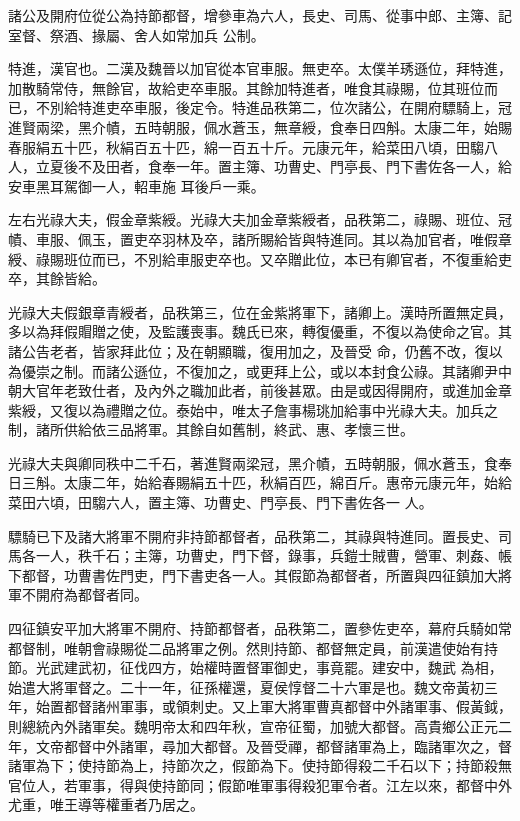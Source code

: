 \begin{pinyinscope}
 諸公及開府位從公為持節都督，增參車為六人，長史、司馬、從事中郎、主簿、記室督、祭酒、掾屬、舍人如常加兵
 公制。



 特進，漢官也。二漢及魏晉以加官從本官車服。無吏卒。太僕羊琇遜位，拜特進，加散騎常侍，無餘官，故給吏卒車服。其餘加特進者，唯食其祿賜，位其班位而已，不別給特進吏卒車服，後定令。特進品秩第二，位次諸公，在開府驃騎上，冠進賢兩梁，黑介幘，五時朝服，佩水蒼玉，無章綬，食奉日四斛。太康二年，始賜春服絹五十匹，秋絹百五十匹，綿一百五十斤。元康元年，給菜田八頃，田騶八人，立夏後不及田者，食奉一年。置主簿、功曹史、門亭長、門下書佐各一人，給安車黑耳駕御一人，軺車施
 耳後戶一乘。



 左右光祿大夫，假金章紫綬。光祿大夫加金章紫綬者，品秩第二，祿賜、班位、冠幘、車服、佩玉，置吏卒羽林及卒，諸所賜給皆與特進同。其以為加官者，唯假章綬、祿賜班位而已，不別給車服吏卒也。又卒贈此位，本已有卿官者，不復重給吏卒，其餘皆給。



 光祿大夫假銀章青綬者，品秩第三，位在金紫將軍下，諸卿上。漢時所置無定員，多以為拜假賵贈之使，及監護喪事。魏氏已來，轉復優重，不復以為使命之官。其諸公告老者，皆家拜此位；及在朝顯職，復用加之，及晉受
 命，仍舊不改，復以為優崇之制。而諸公遜位，不復加之，或更拜上公，或以本封食公祿。其諸卿尹中朝大官年老致仕者，及內外之職加此者，前後甚眾。由是或因得開府，或進加金章紫綬，又復以為禮贈之位。泰始中，唯太子詹事楊珧加給事中光祿大夫。加兵之制，諸所供給依三品將軍。其餘自如舊制，終武、惠、孝懷三世。



 光祿大夫與卿同秩中二千石，著進賢兩梁冠，黑介幘，五時朝服，佩水蒼玉，食奉日三斛。太康二年，始給春賜絹五十匹，秋絹百匹，綿百斤。惠帝元康元年，始給菜田六頃，田騶六人，置主簿、功曹史、門亭長、門下書佐各一
 人。



 驃騎已下及諸大將軍不開府非持節都督者，品秩第二，其祿與特進同。置長史、司馬各一人，秩千石；主簿，功曹史，門下督，錄事，兵鎧士賊曹，營軍、刺姦、帳下都督，功曹書佐門吏，門下書吏各一人。其假節為都督者，所置與四征鎮加大將軍不開府為都督者同。



 四征鎮安平加大將軍不開府、持節都督者，品秩第二，置參佐吏卒，幕府兵騎如常都督制，唯朝會祿賜從二品將軍之例。然則持節、都督無定員，前漢遣使始有持節。光武建武初，征伐四方，始權時置督軍御史，事竟罷。建安中，魏武
 為相，始遣大將軍督之。二十一年，征孫權還，夏侯惇督二十六軍是也。魏文帝黃初三年，始置都督諸州軍事，或領刺史。又上軍大將軍曹真都督中外諸軍事、假黃鉞，則總統內外諸軍矣。魏明帝太和四年秋，宣帝征蜀，加號大都督。高貴鄉公正元二年，文帝都督中外諸軍，尋加大都督。及晉受禪，都督諸軍為上，臨諸軍次之，督諸軍為下；使持節為上，持節次之，假節為下。使持節得殺二千石以下；持節殺無官位人，若軍事，得與使持節同；假節唯軍事得殺犯軍令者。江左以來，都督中外尤重，唯王導等權重者乃居之。




\end{pinyinscope}
